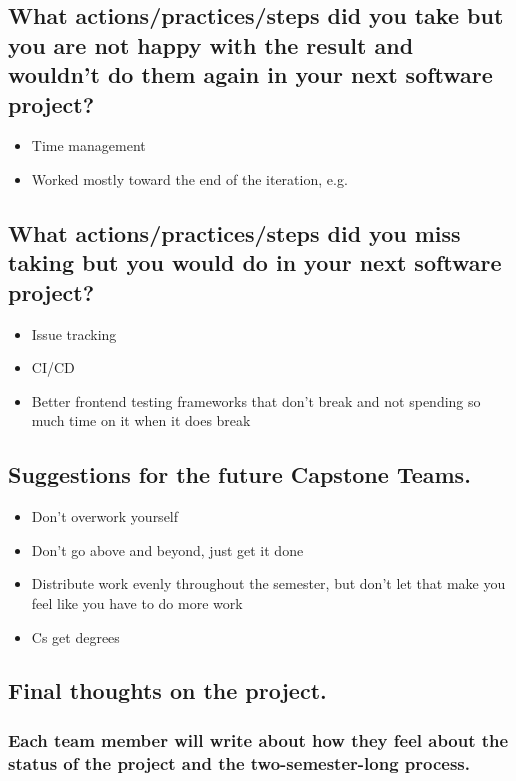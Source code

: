 \documentclass[12pt, letterpaper]{article}
\begin{document}
\subsection{What actions/practices/steps did you take but you are not happy with the result and wouldn't do them again in your next software project?}
\begin{itemize}
	\item{Time management}
	\item{Worked mostly toward the end of the iteration, e.g.}
\end{itemize}
\subsection{What actions/practices/steps did you miss taking but you would do in your next software project?}
\begin{itemize}
	\item{Issue tracking}
	\item{CI/CD}
	\item{Better frontend testing frameworks that don't break and not spending so much time on it when it does break}
\end{itemize}
\subsection{Suggestions for the future Capstone Teams.}
\begin{itemize}
	\item{Don't overwork yourself}
	\item{Don't go above and beyond, just get it done}
	\item{Distribute work evenly throughout the semester, but don't let that make you feel like you have to do more work}
	\item{Cs get degrees}
\end{itemize}
\subsection{Final thoughts on the project.}
\subsubsection{Each team member will write about how they feel about the status of the project and the two-semester-long process.}
\end{document}
